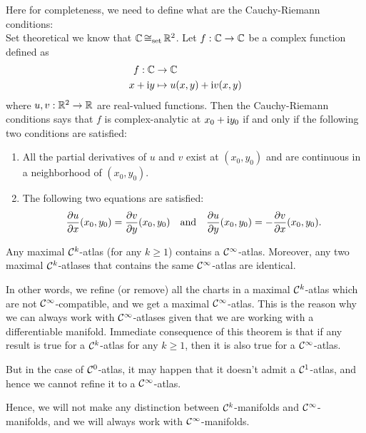 \noindent Here for completeness, we need to define what are the Cauchy-Riemann conditions:\\
Set theoretical we know that \(\mathbb C \operatorname{\cong_{\text{set}}} \mathbb R^2\). Let \(f: \mathbb C \to \mathbb C\) be a complex function defined as
\begin{equation}
	\begin{aligned}
		f: \mathbb C    & \to \mathbb C                       \\
		x + \mathrm{i} y & \mapsto u(x, y) + \mathrm{i} v(x, y)
	\end{aligned}
\end{equation}
where \(u, v: \mathbb R^2 \to \mathbb R\) are real-valued functions. Then the Cauchy-Riemann conditions says that \(f\) is complex-analytic at \(x_0 + \mathrm{i} y_0\) if and only if the following two conditions are satisfied:
\begin{enumerate}
	\item All the partial derivatives of \(u\) and \(v\) exist at \((x_0, y_0)\) and are continuous in a neighborhood of \((x_0, y_0)\).
	\item The following two equations are satisfied:
	      \begin{equation}
		      \pdv{u}{x} \qty(x_0, y_0) = \pdv{v}{y} \qty(x_0, y_0) \quad \text{and} \quad \pdv{u}{y} \qty(x_0, y_0) = -\pdv{v}{x} \qty(x_0, y_0).
	      \end{equation}
\end{enumerate}

\begin{theorem}[Whitney]
	Any maximal \(\mathcal C^k\)-atlas (for any \(k \ge 1\)) contains a \(\mathcal C^{\infty}\)-atlas. Moreover, any two maximal \(\mathcal C^k\)-atlases that contains the same \(\mathcal C^{\infty}\)-atlas are identical.
\end{theorem}
In other words, we refine (or remove) all the charts in a maximal \(\mathcal C^k\)-atlas which are not \(\mathcal C^{\infty}\)-compatible, and we get a maximal \(\mathcal C^{\infty}\)-atlas. This is the reason why we can always work with \(\mathcal C^{\infty}\)-atlases given that we are working with a differentiable manifold. Immediate consequence of this theorem is that if any result is true for a \(\mathcal C^k\)-atlas for any \(k \ge 1\), then it is also true for a \(\mathcal C^{\infty}\)-atlas.

But in the case of \(\mathcal C^0\)-atlas, it may happen that it doesn't admit a \(\mathcal C^1\)-atlas, and hence we cannot refine it to a \(\mathcal C^{\infty}\)-atlas.

Hence, we will not make any distinction between \(\mathcal C^k\)-manifolds and \(\mathcal C^{\infty}\)-manifolds, and we will always work with \(\mathcal C^{\infty}\)-manifolds.

